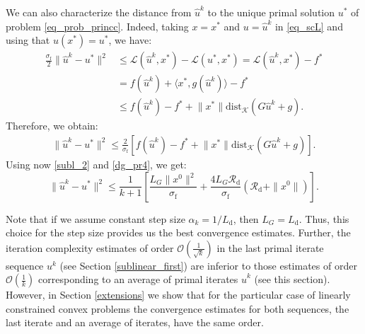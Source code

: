 \documentclass{gOMS2e}
\theoremstyle{plain}
\theoremstyle{definition}
\theoremstyle{remark}
\providecommand{\norm}[1]{\lVert#1\rVert}
\begin{document}
\noindent We can also characterize the distance from $\hat u^k$ to
the unique primal solution $u^*$ of problem \eqref{eq_prob_princc}.
Indeed, taking $x = x^*$ and $u = \hat u^k$ in \eqref{eq_scL} and
using that $u(x^*) = u^*$, we have:
\begin{align*}
 \frac{\sigma_{\mathrm{f}}}{2} \| \hat u^k - {}{u}^*\|^2
& \leq {\mathcal{L}}(\hat u^k,x^*) - {\mathcal{L}}(u^*,x^*) =  {\mathcal{L}}(\hat u^k,x^*) - f^*\\
& =  f(\hat u^k) + \langle x^*, g(\hat u^k) \rangle  - f^* \\
& \leq f(\hat u^k) - f^* + \norm{x^*} \text{dist}_{\mathcal{K}}
(G\hat u^k + g).
\end{align*}
Therefore, we obtain:
\begin{align}
\label{distance} \| \hat u^k - {}{u}^*\|^2 \leq
\frac{2}{\sigma_{\mathrm{f}}} \left[  f(\hat u^k) - f^*  +
\norm{x^*} \text{dist}_{\mathcal{K}} (G\hat u^k + g) \right].
\end{align}
Using now  \eqref{subl_2}  and \eqref{dg_pr4}, we get:
\[   \| \hat u^k - {}{u}^*\|^2  \leq
\frac{1}{k+1} \left[   \frac{L_G \|x^0\|^2}{\sigma_{\mathrm{f}}}  +
 \frac{4 L_G \mathcal{R}_\text{d}}{\sigma_{\mathrm{f}}}
(\mathcal{R}_\text{d} + \|x^0\|) \right]. \]

\noindent Note that if we assume constant step size $\alpha_k
=1/L_\text{d}$, then $L_G= L_\text{d}$.  Thus, this choice for the
step size provides us the  best convergence estimates. Further, the
iteration complexity estimates of order
$\mathcal{O}(\frac{1}{\sqrt{k}})$ in the last primal  iterate
sequence $u^k$ (see Section \ref{sublinear_first}) are inferior to
those estimates of order $\mathcal{O}(\frac{1}{k})$ corresponding to
an average of primal iterates $\hat u^k$ (see this section).
However, in Section \ref{extensions} we show that for the particular
case of linearly constrained convex problems the convergence
estimates for both sequences, the last iterate and an average of
iterates, have the same order.
\end{document}
